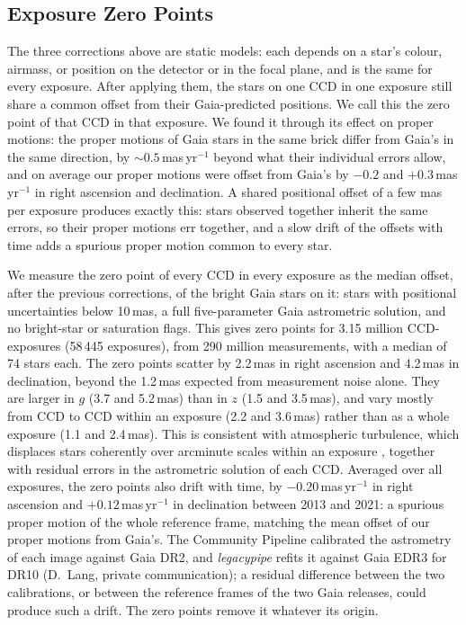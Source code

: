 \documentclass[usenatbib]{mnras}   %
\begin{document}
\subsection{Exposure Zero Points} \label{sec:zeropoints}

The three corrections above are static models: each depends on a star's colour, airmass, or position on the detector or in the focal plane, and is the same for every exposure. After applying them, the stars on one CCD in one exposure still share a common offset from their Gaia-predicted positions. We call this the zero point of that CCD in that exposure. We found it through its effect on proper motions: the proper motions of Gaia stars in the same brick differ from Gaia's in the same direction, by $\sim\!0.5$\,mas\,yr$^{-1}$ beyond what their individual errors allow, and on average our proper motions were offset from Gaia's by $-0.2$ and $+0.3$\,mas\,yr$^{-1}$ in right ascension and declination. A shared positional offset of a few mas per exposure produces exactly this: stars observed together inherit the same errors, so their proper motions err together, and a slow drift of the offsets with time adds a spurious proper motion common to every star.

We measure the zero point of every CCD in every exposure as the median offset, after the previous corrections, of the bright Gaia stars on it: stars with positional uncertainties below 10\,mas, a full five-parameter Gaia astrometric solution, and no bright-star or saturation flags. This gives zero points for 3.15 million CCD-exposures (58\,445 exposures), from 290 million measurements, with a median of 74 stars each. The zero points scatter by 2.2\,mas in right ascension and 4.2\,mas in declination, beyond the 1.2\,mas expected from measurement noise alone. They are larger in $g$ (3.7 and 5.2\,mas) than in $z$ (1.5 and 3.5\,mas), and vary mostly from CCD to CCD within an exposure (2.2 and 3.6\,mas) rather than as a whole exposure (1.1 and 2.4\,mas). This is consistent with atmospheric turbulence, which displaces stars coherently over arcminute scales within an exposure \citep{Bernstein_2017}, together with residual errors in the astrometric solution of each CCD. Averaged over all exposures, the zero points also drift with time, by $-0.20$\,mas\,yr$^{-1}$ in right ascension and $+0.12$\,mas\,yr$^{-1}$ in declination between 2013 and 2021: a spurious proper motion of the whole reference frame, matching the mean offset of our proper motions from Gaia's. The Community Pipeline calibrated the astrometry of each image against Gaia DR2, and \emph{legacypipe} refits it against Gaia EDR3 for DR10 (D.~Lang, private communication); a residual difference between the two calibrations, or between the reference frames of the two Gaia releases, could produce such a drift. The zero points remove it whatever its origin.
\end{document}
